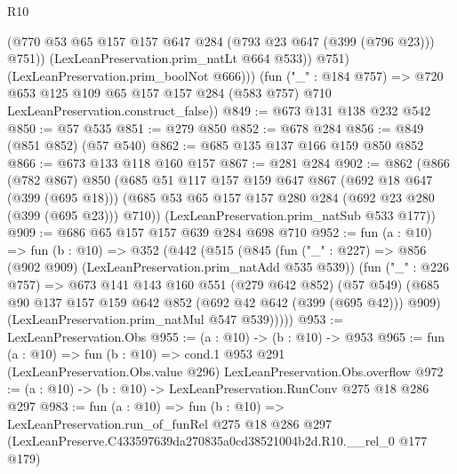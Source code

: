 \begin{lexlean}{R10}
\begin{coremodule}
                (@770 @53 @65 @157 @157 @647 @284 (@793 @23 @647 (@399 (@796 @23))) @751))
              (LexLeanPreservation.prim_natLt @664 @533))
            @751)
          (LexLeanPreservation.prim_boolNot @666)))
      (fun ("_" : @184 @757) =>
      @720 @653 @125 @109 @65 @157 @157 @284 (@583 @757) @710 LexLeanPreservation.construct_false))
@849 := @673 @131 @138 @232 @542
@850 := @57 @535
@851 := @279 @850
@852 := @678 @284
@856 := @849 (@851 @852) (@57 @540)
@862 := @685 @135 @137 @166 @159 @850 @852
@866 := @673 @133 @118 @160 @157
@867 := @281 @284
@902 := @862
    (@866
      (@782 @867)
      @850
      (@685
        @51
        @117
        @157
        @159
        @647
        @867
        (@692 @18 @647 (@399 (@695 @18)))
        (@685 @53 @65 @157 @157 @280 @284 (@692 @23 @280 (@399 (@695 @23))) @710))
      (LexLeanPreservation.prim_natSub @533 @177))
@909 := @686 @65 @157 @157 @639 @284 @698 @710
@952 := fun (a : @10) =>
  fun (b : @10) =>
  @352
    (@442
      (@515
        (@845
          (fun ("_" : @227) => @856 (@902 @909) (LexLeanPreservation.prim_natAdd @535 @539))
          (fun ("_" : @226 @757) =>
          @673
            @141
            @143
            @160
            @551
            (@279 @642 @852)
            (@57 @549)
            (@685 @90 @137 @157 @159 @642 @852 (@692 @42 @642 (@399 (@695 @42))) @909)
            (LexLeanPreservation.prim_natMul @547 @539)))))
@953 := LexLeanPreservation.Obs
@955 := (a : @10) -> (b : @10) -> @953
@965 := fun (a : @10) =>
  fun (b : @10) =>
  cond.{1} @953 @291 (LexLeanPreservation.Obs.value @296) LexLeanPreservation.Obs.overflow
@972 := (a : @10) -> (b : @10) -> LexLeanPreservation.RunConv @275 @18 @286 @297
@983 := fun (a : @10) =>
  fun (b : @10) =>
  LexLeanPreservation.run_of_funRel
    @275
    @18
    @286
    @297
    (LexLeanPreserve.C433597639da270835a0cd38521004b2d.R10.__rel_0 @177 @179)
\end{coremodule}
\end{lexlean}
